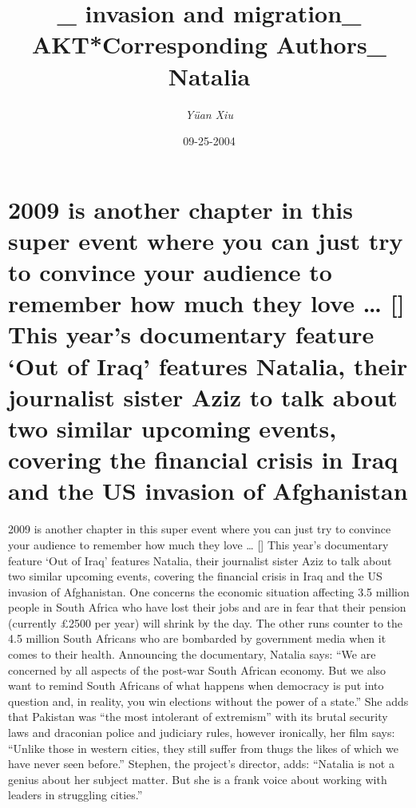 \documentclass{article}%
\title{\_ invasion and migration\_ AKT*Corresponding Authors\_ Natalia}%
\author{\textit{Yüan Xiu}}%
\date{09-25-2004}%
\begin{document}
%
\normalsize%
\maketitle%
\section{2009 is another chapter in this super event where you can just try to convince your audience to remember how much they love … {[}{]}\newline%
This year’s documentary feature ‘Out of Iraq’ features Natalia, their journalist sister Aziz to talk about two similar upcoming events, covering the financial crisis in Iraq and the US invasion of Afghanistan}%
\label{sec:2009isanotherchapterinthissupereventwhereyoucanjusttrytoconvinceyouraudiencetorememberhowmuchtheyloveThisyearsdocumentaryfeatureOutofIraqfeaturesNatalia,theirjournalistsisterAziztotalkabouttwosimilarupcomingevents,coveringthefinancialcrisisinIraqandtheUSinvasionofAfghanistan}%
2009 is another chapter in this super event where you can just try to convince your audience to remember how much they love … {[}{]}\newline%
This year’s documentary feature ‘Out of Iraq’ features Natalia, their journalist sister Aziz to talk about two similar upcoming events, covering the financial crisis in Iraq and the US invasion of Afghanistan.\newline%
One concerns the economic situation affecting 3.5 million people in South Africa who have lost their jobs and are in fear that their pension (currently £2500 per year) will shrink by the day.\newline%
The other runs counter to the 4.5 million South Africans who are bombarded by government media when it comes to their health.\newline%
Announcing the documentary, Natalia says: “We are concerned by all aspects of the post{-}war South African economy. But we also want to remind South Africans of what happens when democracy is put into question and, in reality, you win elections without the power of a state.”\newline%
She adds that Pakistan was “the most intolerant of extremism” with its brutal security laws and draconian police and judiciary rules, however ironically, her film says: “Unlike those in western cities, they still suffer from thugs the likes of which we have never seen before.”\newline%
Stephen, the project’s director, adds: “Natalia is not a genius about her subject matter. But she is a frank voice about working with leaders in struggling cities.”\newline%
\end{document}
